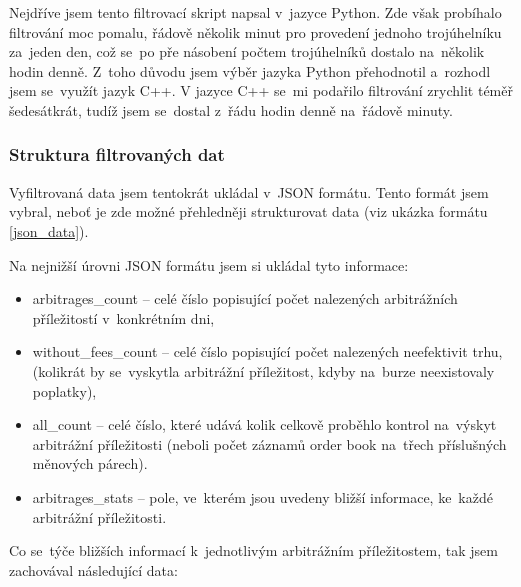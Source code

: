 \documentclass[thesis=B,czech]{FITthesis}[2019/03/21]
\begin{document}
Nejdříve jsem tento filtrovací skript napsal v~jazyce Python. Zde však probíhalo filtrování moc pomalu, řádově několik minut pro provedení jednoho trojúhelníku za~jeden den, což se~po pře násobení počtem trojúhelníků dostalo na~několik hodin denně. Z~toho důvodu jsem výběr jazyka Python přehodnotil a~rozhodl jsem se~využít jazyk C++. V jazyce C++ se~mi podařilo filtrování zrychlit téměř šedesátkrát, tudíž jsem se~dostal z~řádu hodin denně na~řádově minuty.

\subsubsection{Struktura filtrovaných dat}
Vyfiltrovaná data jsem  tentokrát ukládal v~JSON formátu. Tento formát jsem vybral, neboť je zde možné přehledněji strukturovat data (viz ukázka formátu \ref{json_data}).

Na nejnižší úrovni JSON formátu jsem si ukládal tyto informace:
\begin{itemize}
    \item arbitrages\_count -- celé číslo popisující počet nalezených arbitrážních příležitostí v~konkrétním dni,
    \item without\_fees\_count -- celé číslo popisující počet nalezených neefektivit trhu, (kolikrát by se~vyskytla arbitrážní příležitost, kdyby na~burze neexistovaly poplatky), 
    \item all\_count -- celé číslo, které udává kolik celkově proběhlo kontrol na~výskyt arbitrážní příležitosti (neboli počet záznamů order book na~třech \linebreak příslušných měnových párech).
    \item arbitrages\_stats -- pole, ve~kterém jsou uvedeny bližší informace, ke~každé arbitrážní příležitosti. 
\end{itemize}
Co se~týče bližších informací k~jednotlivým arbitrážním příležitostem, tak jsem zachovával následující data:
\end{document}
